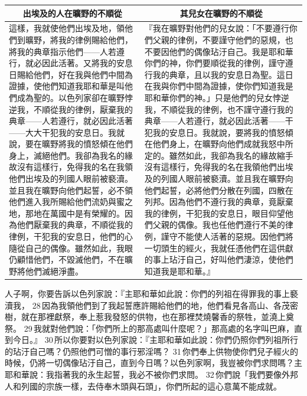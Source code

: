 \begin{table}[H]
\centering
\begin{tabular}{p{7.75cm}|p{9.25cm}}\hline\hline
\multicolumn{1}{c|}{出埃及的人在曠野的不順從}&\multicolumn{1}{c}{其兒女在曠野的不順從}\\\hline
這樣，我就使他們出埃及地，領他們到曠野，將我的律例賜給他們，將我的典章指示他們——人若遵行，就必因此活著。又將我的安息日賜給他們，好在我與他們中間為證據，使他們知道我耶和華是叫他們成為聖的。以色列家卻在曠野悖逆我，不順從我的律例，厭棄我的典章——人若遵行，就必因此活著——大大干犯我的安息日。我就說，要在曠野將我的憤怒傾在他們身上，滅絕他們。我卻為我名的緣故沒有這樣行，免得我的名在我領他們出埃及的列國人眼前被褻瀆。並且我在曠野向他們起誓，必不領他們進入我所賜給他們流奶與蜜之地，那地在萬國中是有榮耀的。因為他們厭棄我的典章，不順從我的律例，干犯我的安息日，他們的心隨從自己的偶像。雖然如此，我眼仍顧惜他們，不毀滅他們，不在曠野將他們滅絕淨盡。
&『我在曠野對他們的兒女說：「不要遵行你們父親的律例，不要謹守他們的惡規，也不要因他們的偶像玷汙自己。我是耶和華你們的神，你們要順從我的律例，謹守遵行我的典章，且以我的安息日為聖。這日在我與你們中間為證據，使你們知道我是耶和華你們的神。」只是他們的兒女悖逆我，不順從我的律例，也不謹守遵行我的典章——人若遵行，就必因此活著——干犯我的安息日。我就說，要將我的憤怒傾在他們身上，在曠野向他們成就我怒中所定的。雖然如此，我卻為我名的緣故縮手沒有這樣行，免得我的名在我領他們出埃及的列國人眼前被褻瀆。並且我在曠野向他們起誓，必將他們分散在列國，四散在列邦。因為他們不遵行我的典章，竟厭棄我的律例，干犯我的安息日，眼目仰望他們父親的偶像。我也任他們遵行不美的律例，謹守不能使人活著的惡規。因他們將一切頭生的經火，我就任憑他們在這供獻的事上玷汙自己，好叫他們淒涼，使他們知道我是耶和華。』\\\hline
\end{tabular}
\end{table}



人子啊，你要告訴以色列家說：『主耶和華如此說：你們的列祖在得罪我的事上褻瀆我， 28 因為我領他們到了我起誓應許賜給他們的地，他們看見各高山、各茂密樹，就在那裡獻祭，奉上惹我發怒的供物，也在那裡焚燒馨香的祭牲，並澆上奠祭。 29 我就對他們說：「你們所上的那高處叫什麼呢？」那高處的名字叫巴麻，直到今日。』 30 所以你要對以色列家說：『主耶和華如此說：你們仍照你們列祖所行的玷汙自己嗎？仍照他們可憎的事行邪淫嗎？ 31 你們奉上供物使你們兒子經火的時候，仍將一切偶像玷汙自己，直到今日嗎？以色列家啊，我豈被你們求問嗎？主耶和華說：我指著我的永生起誓，我必不被你們求問。 32 你們說「我們要像外邦人和列國的宗族一樣，去侍奉木頭與石頭」，你們所起的這心意萬不能成就。

